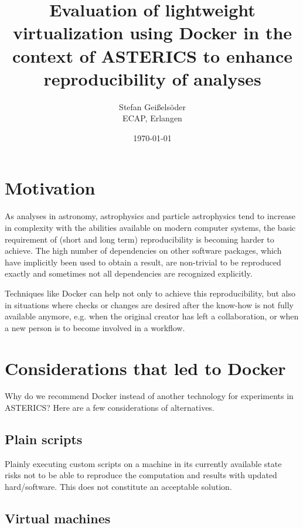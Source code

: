 \documentclass[a4paper, twoside, 11pt]{article}
\begin{document}
\title{Evaluation of lightweight virtualization using Docker in the context of ASTERICS to enhance reproducibility of analyses}
\author{Stefan Geißelsöder\\
ECAP, Erlangen}
\date{\today}
\maketitle

\section{Motivation}

As analyses in astronomy, astrophysics and particle astrophysics tend to increase in complexity 
with the abilities available on modern computer systems, 
the basic requirement of (short and long term) reproducibility is becoming harder to achieve. 
The high number of dependencies on other software packages, which have implicitly been used to obtain a result, 
are non-trivial to be reproduced exactly and sometimes not all dependencies are recognized explicitly. 

Techniques like Docker can help not only to achieve this reproducibility, 
but also in situations where checks or changes are desired after the know-how is not fully available anymore, 
e.g. when the original creator has left a collaboration, or when a new person is to become involved in a workflow. 

\section{Considerations that led to Docker}

Why do we recommend Docker instead of another technology for experiments in ASTERICS? 
Here are a few considerations of alternatives. 


\subsection{Plain scripts}

Plainly executing custom scripts on a machine in its currently available state 
risks not to be able to reproduce the computation and results with updated hard/software. 
This does not constitute an acceptable solution. 


\subsection{Virtual machines}
\end{document}
